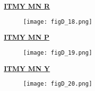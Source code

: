 \clearpage
\noindent
\underline{{\bf ITMY MN R}}
\begin{figure}[H]
\begin{center}
\texttt{[image: figD\_18.png]}
\end{center}
\end{figure}
\noindent
\underline{{\bf ITMY MN P}}
\begin{figure}[H]
\begin{center}
\texttt{[image: figD\_19.png]}
\end{center}
\end{figure}
\noindent
\underline{{\bf ITMY MN Y}}
\begin{figure}[H]
\begin{center}
\texttt{[image: figD\_20.png]}
\end{center}
\end{figure}